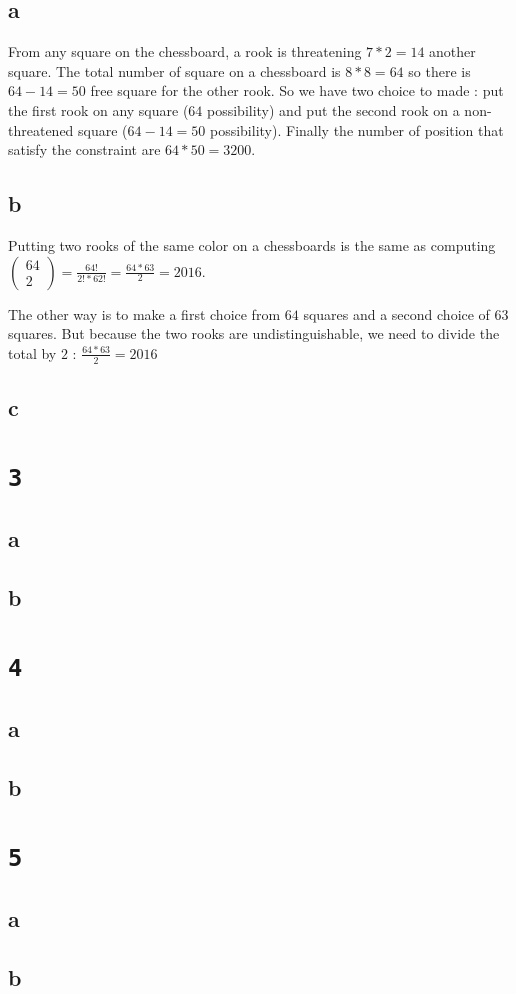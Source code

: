 \documentclass[a4paper,11pt]{report}
\begin{document}
\subsection*{a}

From any square on the chessboard, a rook is threatening $7*2 = 14$ another
square. The total number of square on a chessboard is $8*8 = 64$ so there is
$64-14 = 50$ free square for the other rook. So we have two choice to made : put
the first rook on any square ($64$ possibility) and put the second rook on a
non-threatened square ($64 - 14 = 50$ possibility). Finally the number of
position that satisfy the constraint are $64 * 50 = 3200$.

\subsection*{b}

Putting two rooks of the same color on a chessboards is the same as computing
$\begin{pmatrix}64 \\ 2\end{pmatrix} = \frac{64!}{2! * 62!} = \frac{64 * 63}{2}
= 2016$.

The other way is to make a first choice from $64$ squares and a second choice of
$63$ squares. But because the two rooks are undistinguishable, we need to divide
the total by $2$ : $\frac{64*63}{2} = 2016$

\subsection*{c}



\section*{\texttt{3}}
\subsection*{a}
\subsection*{b}

\section*{\texttt{4}}
\subsection*{a}
\subsection*{b}

\section*{\texttt{5}}
\subsection*{a}
\subsection*{b}
\end{document}
